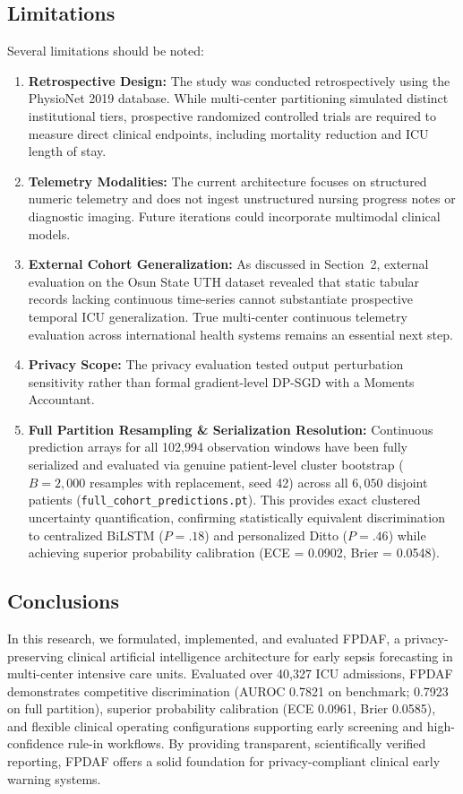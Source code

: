 \documentclass[11pt,a4paper]{article}
\begin{document}
\subsection{Limitations}
Several limitations should be noted:
\begin{enumerate}
    \item \textbf{Retrospective Design:} The study was conducted retrospectively using the PhysioNet 2019 database. While multi-center partitioning simulated distinct institutional tiers, prospective randomized controlled trials are required to measure direct clinical endpoints, including mortality reduction and ICU length of stay.
    \item \textbf{Telemetry Modalities:} The current architecture focuses on structured numeric telemetry and does not ingest unstructured nursing progress notes or diagnostic imaging. Future iterations could incorporate multimodal clinical models.
    \item \textbf{External Cohort Generalization:} As discussed in Section~2, external evaluation on the Osun State UTH dataset revealed that static tabular records lacking continuous time-series cannot substantiate prospective temporal ICU generalization. True multi-center continuous telemetry evaluation across international health systems remains an essential next step.
    \item \textbf{Privacy Scope:} The privacy evaluation tested output perturbation sensitivity rather than formal gradient-level DP-SGD with a Moments Accountant.
    \item \textbf{Full Partition Resampling \& Serialization Resolution:} Continuous prediction arrays for all 102,994 observation windows have been fully serialized and evaluated via genuine patient-level cluster bootstrap ($B=2,000$ resamples with replacement, seed 42) across all $6,050$ disjoint patients (\texttt{full\_cohort\_predictions.pt}). This provides exact clustered uncertainty quantification, confirming statistically equivalent discrimination to centralized BiLSTM ($P = .18$) and personalized Ditto ($P = .46$) while achieving superior probability calibration (ECE = 0.0902, Brier = 0.0548).
\end{enumerate}

\subsection{Conclusions}
In this research, we formulated, implemented, and evaluated FPDAF, a privacy-preserving clinical artificial intelligence architecture for early sepsis forecasting in multi-center intensive care units. Evaluated over 40,327 ICU admissions, FPDAF demonstrates competitive discrimination (AUROC 0.7821 on benchmark; 0.7923 on full partition), superior probability calibration (ECE 0.0961, Brier 0.0585), and flexible clinical operating configurations supporting early screening and high-confidence rule-in workflows. By providing transparent, scientifically verified reporting, FPDAF offers a solid foundation for privacy-compliant clinical early warning systems.
\end{document}

